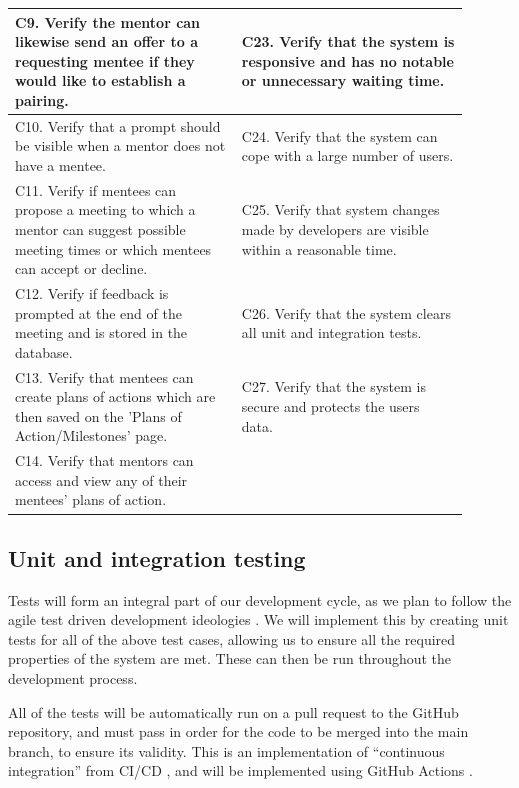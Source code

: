 \documentclass[10pt]{article}
\begin{document}
\begin{longtable}{|p{0.45\linewidth}||p{0.45\linewidth}|}
    C9. Verify the mentor can likewise send an offer to a requesting mentee if they would like to establish a pairing.
    &
    C23. Verify that the system is responsive and has no notable or unnecessary waiting time.
    \\ \hline

    C10. Verify that a prompt should be visible when a mentor does not have a mentee.
    &
    C24. Verify that the system can cope with a large number of users.
    \\ \hline

    C11. Verify if mentees can propose a meeting to which a mentor can suggest possible meeting times or which mentees can accept or decline.
    &
    C25. Verify that system changes made by developers are visible within a reasonable time.
    \\ \hline

    C12. Verify if feedback is prompted at the end of the meeting and is stored in the database.
    &
    C26. Verify that the system clears all unit and integration tests.
    \\ \hline

    C13. Verify that mentees can create plans of actions which are then saved on the 'Plans of Action/Milestones' page.
    &
    C27. Verify that the system is secure and protects the users data.
    \\ \hline

    C14. Verify that mentors can access and view any of their mentees' plans of action.
    & \\ \hline

\end{longtable}



\subsection{Unit and integration testing}
Tests will form an integral part of our development cycle, as we plan to follow
the agile test driven development ideologies \cite{tdd}. We will implement this
by creating unit tests for all of the above test cases, allowing us to ensure
all the required properties of the system are met. These can then be run
throughout the development process.

All of the tests will be automatically run on a pull request to the GitHub
repository, and must pass in order for the code to be merged into the main
branch, to ensure its validity. This is an implementation of ``continuous
integration'' from CI/CD \cite{CICD}, and will be implemented using GitHub
Actions \cite{githubActions}.
\end{document}
